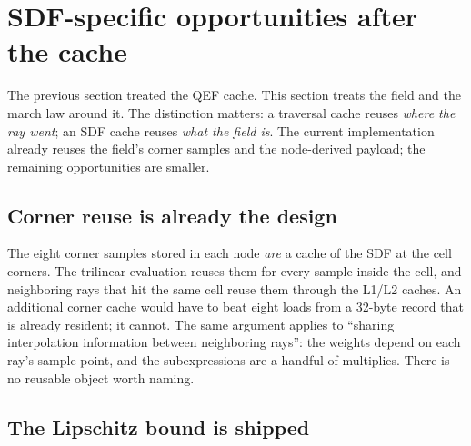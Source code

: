 \documentclass[11pt,a4paper]{article}
\theoremstyle{plain}
\theoremstyle{definition}
\theoremstyle{remark}
\begin{document}
\section{SDF-specific opportunities after the cache}
\label{sec:sdfcache}

The previous section treated the QEF cache. This section treats the field and
the march law around it. The distinction matters: a traversal cache reuses
\emph{where the ray went}; an SDF cache reuses \emph{what the field is}. The
current implementation already reuses the field's corner samples and the
node-derived payload; the remaining opportunities are smaller.

\subsection{Corner reuse is already the design}

The eight corner samples stored in each node \emph{are} a cache of the SDF at
the cell corners. The trilinear evaluation reuses them for every sample inside
the cell, and neighboring rays that hit the same cell reuse them through the
L1/L2 caches. An additional corner cache would have to beat eight loads from a
32-byte record that is already resident; it cannot. The same argument applies
to ``sharing interpolation information between neighboring rays'': the
weights depend on each ray's sample point, and the subexpressions are a handful
of multiplies. There is no reusable object worth naming.

\subsection{The Lipschitz bound is shipped}
\end{document}
